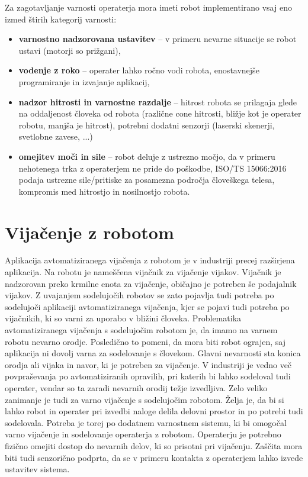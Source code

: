 Za zagotavljanje varnosti operaterja mora imeti robot implementirano vsaj eno izmed štirih kategorij varnosti:
\begin{itemize}
	\item \textbf{varnostno nadzorovana ustavitev} -- v primeru nevarne situacije se robot ustavi (motorji so prižgani),
	\item \textbf{vodenje z roko}  -- operater lahko ročno vodi robota, enostavnejše programiranje in izvajanje aplikacij,
	\item \textbf{nadzor hitrosti in varnostne razdalje} -- hitrost robota se prilagaja glede na oddaljenost človeka od robota (različne cone hitrosti, bližje kot je operater robotu, manjša je hitrost), potrebni dodatni senzorji (laserski skenerji, svetlobne zavese, ...)
	\item \textbf{omejitev moči in sile} -- robot deluje z ustrezno močjo, da v primeru nehotenega trka z operaterjem ne pride do poškodbe, ISO/TS 15066:2016 podaja ustrezne sile/pritiske za posamezna področja človeškega telesa, kompromis med hitrostjo in nosilnostjo robota.
\end{itemize}

\section{Vijačenje z robotom}
Aplikacija avtomatiziranega vijačenja z robotom je v industriji precej razširjena aplikacija. Na robotu je nameščena vijačnik za vijačenje vijakov. Vijačnik je nadzorovan preko krmilne enota za vijačenje, običajno je potreben še podajalnik vijakov. Z uvajanjem sodelujočih robotov se zato pojavlja tudi potreba po sodelujoči aplikaciji avtomatiziranega vijačenja, kjer se pojavi tudi potreba po vijačnikih, ki so varni za uporabo v bližini človeka. Problematika avtomatiziranega vijačenja s sodelujočim robotom je, da imamo na varnem robotu nevarno orodje. Posledično to pomeni, da mora biti robot ograjen, saj aplikacija ni dovolj varna za sodelovanje s človekom. Glavni nevarnosti sta konica orodja ali vijaka in navor, ki je potreben za vijačenje.
V industriji je vedno več povpraševanja po avtomatiziranih opravilih, pri katerih bi lahko sodeloval tudi operater, vendar so ta zaradi nevarnih orodij težje izvedljiva. Zelo veliko zanimanje je tudi za varno vijačenje s sodelujočim robotom. Želja je, da bi si lahko robot in operater pri izvedbi naloge delila delovni prostor in po potrebi tudi sodelovala. Potreba je torej po dodatnem varnostnem sistemu, ki bi omogočal varno vijačenje in sodelovanje operaterja z robotom. Operaterju je potrebno fizično omejiti dostop do nevarnih delov, ki so prisotni pri vijačenju. Zaščita mora biti tudi senzorično podprta, da se v primeru kontakta z operaterjem lahko izvede ustavitev sistema.


